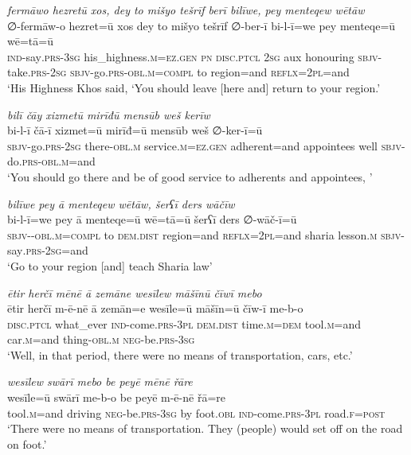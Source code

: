\ea \label{ŽP.91}
\textit{fermāwo hezretū xos, dey to mišyo tešrīf berī bilīwe, pey menteqew wētāw} \\ 
\gll ∅-fermāw-o hezret=ū xos dey to mišyo tešrīf ∅-ber-ī bi-l-ī=we pey menteqe=ū wē=tā=ū \\ 
 \textsc{ind-}say\textsc{.prs}\textsc{-3sg} his\_highness\textsc{.m}\textsc{\textsc{=ez.gen}} \textsc{pn} \textsc{disc.ptcl} \textsc{2sg} aux honouring \textsc{sbjv-}take\textsc{.prs}-\textsc{2sg} \textsc{sbjv-}go\textsc{.prs}\textsc{-obl}\textsc{.m}\textsc{=compl} to region=and \textsc{reflx}=\textsc{2pl}=and \\ 
\glt `His Highness Khos said, ‘You should leave [here and] return to your region.'
\z 
 
\ea \label{ŽP.92}
\textit{bilī čāy xizmetū mirīđū mensūb weš kerīw} \\ 
\gll bi-l-ī čā-ī xizmet=ū mirīđ=ū mensūb weš ∅-ker-ī=ū \\ 
 \textsc{sbjv-}go\textsc{.prs}-\textsc{2sg} there\textsc{-obl}\textsc{.m} service\textsc{.m}\textsc{\textsc{=ez.gen}} adherent=and appointees well \textsc{sbjv-}do\textsc{.prs}\textsc{-obl}\textsc{.m}=and \\ 
\glt `You should go there and be of good service to adherents and appointees, '
\z 
 
\ea \label{ŽP.93}
\textit{bilīwe pey ā menteqew wētāw, šerʕī ders wāčīw} \\ 
\gll bi-l-ī=we pey ā menteqe=ū wē=tā=ū šerʕī ders ∅-wāč-ī=ū \\ 
 \textsc{sbjv-}\textsc{-obl}\textsc{.m}\textsc{=compl} to \textsc{dem.dist} region=and \textsc{reflx}=\textsc{2pl}=and sharia lesson\textsc{.m} \textsc{sbjv-}say\textsc{.prs-}\textsc{2sg}=and \\ 
\glt `Go to your region [and] teach Sharia law'
\z 
 
\ea \label{ŽP.98}
\textit{ētir herčī mēnē ā zemāne wesīlew māšīnū čīwī mebo} \\ 
\gll ētir herčī m-ē-nē ā zemān=e wesīle=ū māšīn=ū čīw-ī me-b-o \\ 
 \textsc{disc.ptcl} what\_ever \textsc{ind-}come\textsc{.prs}\textsc{-3pl} \textsc{dem.dist} time\textsc{.m}\textsc{=dem} tool\textsc{.m}=and car\textsc{.m}=and thing\textsc{-obl}\textsc{.m} \textsc{neg-}be\textsc{.prs}\textsc{-3sg} \\ 
\glt `Well, in that period, there were no means of transportation, cars, etc.'
\z 
 
\ea \label{ŽP.99}
\textit{wesīlew swārī mebo be peyē mēnē řāre} \\ 
\gll wesīle=ū swārī me-b-o be peyē m-ē-nē řā=re \\ 
 tool\textsc{.m}=and driving \textsc{neg-}be\textsc{.prs}\textsc{-3sg} by foot\textsc{.obl} \textsc{ind-}come\textsc{.prs}\textsc{-3pl} road\textsc{.f}\textsc{=\textsc{post}} \\ 
\glt `There were no means of transportation. They (people) would set off on the road on foot.'
\z 
 
